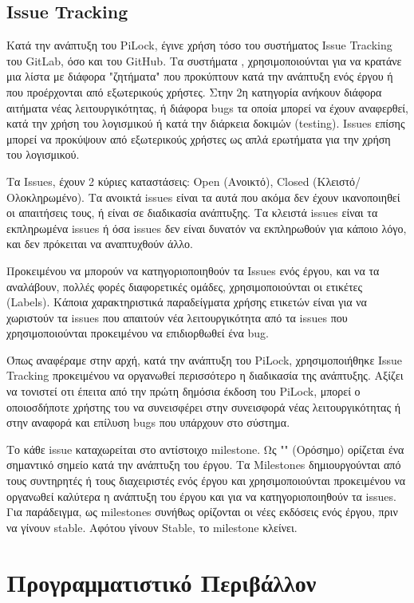 	\subsection{Issue Tracking}
		Κατά την ανάπτυξη του PiLock, έγινε χρήση τόσο του συστήματος Issue Tracking του GitLab, όσο και του GitHub. Τα συστήματα , χρησιμοποιούνται για να κρατάνε μια λίστα με διάφορα "ζητήματα" που προκύπτουν κατά την ανάπτυξη ενός έργου ή που προέρχονται από εξωτερικούς χρήστες. Στην 2η κατηγορία ανήκουν διάφορα αιτήματα νέας λειτουργικότητας, ή διάφορα bugs τα οποία μπορεί να έχουν αναφερθεί, κατά την χρήση του λογισμικού ή κατά την διάρκεια δοκιμών (testing). Issues επίσης μπορεί να προκύψουν από εξωτερικούς χρήστες ως απλά ερωτήματα για την χρήση του λογισμικού.

		Τα Issues, έχουν 2 κύριες καταστάσεις: Open (Ανοικτό), Closed (Κλειστό/Ολοκληρωμένο). Τα ανοικτά issues είναι τα αυτά που ακόμα δεν έχουν ικανοποιηθεί οι απαιτήσεις τους, ή είναι σε διαδικασία ανάπτυξης. Τα κλειστά issues είναι τα εκπληρωμένα issues ή όσα issues δεν είναι δυνατόν να εκπληρωθούν για κάποιο λόγο, και δεν πρόκειται να αναπτυχθούν άλλο.

		Προκειμένου να μπορούν να κατηγοριοποιηθούν τα Issues ενός έργου, και να τα αναλάβουν, πολλές φορές διαφορετικές ομάδες, χρησιμοποιούνται οι ετικέτες (Labels). Κάποια χαρακτηριστικά παραδείγματα χρήσης ετικετών είναι για να χωριστούν τα issues που απαιτούν νέα λειτουργικότητα από τα issues που χρησιμοποιούνται προκειμένου να επιδιορθωθεί ένα bug.

		Όπως αναφέραμε στην αρχή, κατά την ανάπτυξη του PiLock, χρησιμοποιήθηκε Issue Tracking προκειμένου να οργανωθεί περισσότερο η διαδικασία της ανάπτυξης. Αξίζει να τονιστεί οτι έπειτα από την πρώτη δημόσια έκδοση του PiLock, μπορεί ο οποιοσδήποτε χρήστης του να συνεισφέρει στην συνεισφορά νέας λειτουργικότητας ή στην αναφορά και επίλυση bugs που υπάρχουν στο σύστημα.

		Το κάθε issue καταχωρείται στο αντίστοιχο milestone. Ως "" (Ορόσημο) ορίζεται ένα σημαντικό σημείο κατά την ανάπτυξη του έργου. Τα Milestones δημιουργούνται από τους συντηρητές ή τους διαχειριστές ενός έργου και χρησιμοποιούνται προκειμένου να οργανωθεί καλύτερα η ανάπτυξη του έργου και για να κατηγοριοποιηθούν τα issues. Για παράδειγμα, ως milestones συνήθως ορίζονται οι νέες εκδόσεις ενός έργου, πριν να γίνουν stable. Αφότου γίνουν Stable, το milestone κλείνει.

\section{Προγραμματιστικό Περιβάλλον}
	\label{sec:ides}
